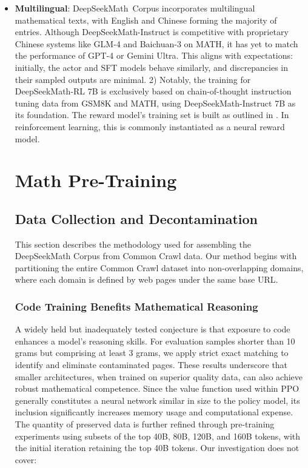 \begin{itemize}[topsep=0pt]
DeepSeekMath-Base is assessed on its aptitude for mathematical problem solving through the use of few-shot chain-of-thought prompting \citep{cot}, evaluated across eight different benchmarks in both English and Chinese. Each problem is matched with a solution crafted in various reasoning formats: chain-of-thought (CoT) \citep{cot}, program-of-thought (PoT) \citep{pot,pal}, or with tool-based reasoning as proposed in \citep{tora}. \item \textbf{Multilingual}:
    DeepSeekMath~Corpus incorporates multilingual mathematical texts, with English and Chinese forming the majority of entries. Although DeepSeekMath-Instruct is competitive with proprietary Chinese systems like GLM-4 and Baichuan-3 on MATH, it has yet to match the performance of GPT-4 or Gemini Ultra. This aligns with expectations: initially, the actor and SFT models behave similarly, and discrepancies in their sampled outputs are minimal. 2) Notably, the training for DeepSeekMath-RL 7B is exclusively based on chain-of-thought instruction tuning data from GSM8K and MATH, using DeepSeekMath-Instruct 7B as its foundation. The reward model’s training set is built as outlined in \citep{wang2023math}. In reinforcement learning, this is commonly instantiated as a neural reward model. \section{Math Pre-Training}

\subsection{Data Collection and Decontamination}
This section describes the methodology used for assembling the DeepSeekMath Corpus from Common Crawl data. Our method begins with partitioning the entire Common Crawl dataset into non-overlapping domains, where each domain is defined by web pages under the same base URL. \subsubsection{Code Training Benefits Mathematical Reasoning}

A widely held but inadequately tested conjecture is that exposure to code enhances a model’s reasoning skills. For evaluation samples shorter than 10 grams but comprising at least 3 grams, we apply strict exact matching to identify and eliminate contaminated pages. These results underscore that smaller architectures, when trained on superior quality data, can also achieve robust mathematical competence. Since the value function used within PPO generally constitutes a neural network similar in size to the policy model, its inclusion significantly increases memory usage and computational expense. The quantity of preserved data is further refined through pre-training experiments using subsets of the top 40B, 80B, 120B, and 160B tokens, with the initial iteration retaining the top 40B tokens. Our investigation does not cover:


\end{itemize}

